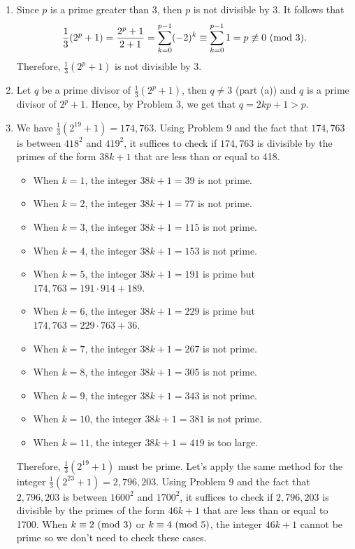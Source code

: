 \begin{solution}
    \begin{enumerate}
        \item Since $p$ is a prime greater than 3, then $p$ is not divisible by 3. It follows that
        $$\frac{1}{3}(2^p + 1) = \frac{2^p + 1}{2 + 1} = \sum_{k=0}^{p-1}(-2)^k \equiv \sum_{k=0}^{p-1}1 = p \not\equiv 0 \ (\mathrm{mod}\ 3).$$
        Therefore, $\frac{1}{3}(2^p + 1)$ is not divisible by 3.
        \item Let $q$ be a prime divisor of $\frac{1}{3}(2^p + 1)$, then $q \neq 3$ (part (a)) and $q$ is a prime divisor of $2^p + 1$. Hence, by Problem 3, we get that $q = 2kp + 1 > p$.
        \item We have $\frac{1}{3}(2^{19} + 1) = 174,763$. Using Problem 9 and the fact that $174,763$ is between $418^2$ and $419^2$, it suffices to check if $174,763$ is divisible by the primes of the form $38k+ 1$ that are less than or equal to 418.
        \begin{itemize}
            \item When $k = 1$, the integer $38k + 1 = 39$ is not prime.
            \item When $k = 2$, the integer $38k + 1 = 77$ is not prime.
            \item When $k = 3$, the integer $38k + 1 = 115$ is not prime.
            \item When $k = 4$, the integer $38k + 1 = 153$ is not prime.
            \item When $k = 5$, the integer $38k + 1 = 191$ is prime but $174,763 = 191\cdot 914 + 189$.
            \item When $k = 6$, the integer $38k + 1 = 229$ is prime but $174,763 = 229\cdot 763 + 36$.
            \item When $k = 7$, the integer $38k + 1 = 267$ is not prime.
            \item When $k = 8$, the integer $38k + 1 = 305$ is not prime.
            \item When $k = 9$, the integer $38k + 1 = 343$ is not prime.
            \item When $k = 10$, the integer $38k + 1 = 381$ is not prime.
            \item When $k = 11$, the integer $38k + 1 = 419$ is too large.
        \end{itemize}
        Therefore, $\frac{1}{3}(2^{19} + 1)$ must be prime. Let's apply the same method for the integer $\frac{1}{3}(2^{23} + 1) = 2,796,203$. Using Problem 9 and the fact that $2,796,203$ is between $1600^2$ and $1700^2$, it suffices to check if $2,796,203$ is divisible by the primes of the form $46k+ 1$ that are less than or equal to 1700. When $k \equiv 2 \ (\mathrm{mod}\ 3)$ or $k \equiv 4 \ (\mathrm{mod}\ 5)$, the integer $46k + 1$ cannot be prime so we don't need to check these cases.

\end{enumerate}
\end{solution}
